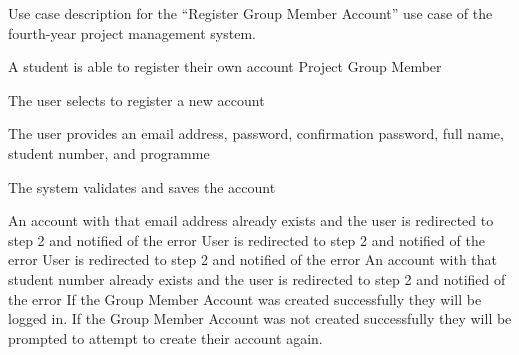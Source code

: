 \documentclass[document.tex]{subfiles}
\begin{document}
\begin{table}[!htbp]
  \centering
  \caption{Use case description for the ``Register Group Member Account'' use case of the fourth-year project management system.}
  \label{tbl:use-case-register-member-account}

  \begin{usecase}
    A student is able to register their own account
    Project Group Member
    \ucnormal
    \begin{ucenum}
      \item The user selects to register a new account
      \item The user provides an email address, password, confirmation password, full name, student number, and programme
      \item The system validates and saves the account
    \end{ucenum}
    An account with that email address already exists and the user is redirected to step 2 and notified of the error
    User is redirected to step 2 and notified of the error
    User is redirected to step 2 and notified of the error
    An account with that student number already exists and the user is redirected to step 2 and notified of the error
    If the Group Member Account was created successfully they will be logged in. If the Group Member Account was not created successfully they will be prompted to attempt to create their account again.
  \end{usecase}
\end{table}
\end{document}
